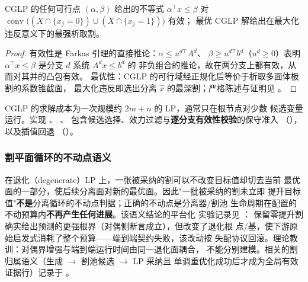 \begin{proposition}
\label{prop:cglp}
CGLP 的任何可行点 $(\alpha, \beta)$ 给出的不等式
$\alpha^\top x \le \beta$ 对
$\operatorname{conv}\big((X\cap\{x_j=0\}) \cup (X\cap\{x_j=1\})\big)$ 有效；
最优 CGLP 解给出在最大化违反意义下的最强析取割。
\end{proposition}
\begin{proof}
有效性是 Farkas 引理的直接推论：$\alpha \le u^{d\top} A^{d}$、
$\beta \ge u^{d\top} b^{d}$（$u^d \ge 0$）表明
$\alpha^\top x \le \beta$ 是分支 $d$ 系统 $A^{d} x \le b^{d}$ 的
非负组合的推论，故在两分支上都有效，从而对其并的凸包有效。
最优性：CGLP 的可行域经正规化后等价于析取多面体极割的系数锥截面，
最大化违反即选出分离 $\hat x$ 的最深割；严格陈述与证明见
\cite{balas1993,cornuejols2008}。
\end{proof}

\begin{remark}
CGLP 的求解成本为一次规模约 $2m + n$ 的 LP，通常只在根节点对少数
候选变量运行。实现
、
、
包含候选选择、效力过滤与\textbf{逐分支有效性校验}的保守准入
（），
以及插值回退
（）。
\end{remark}

\subsubsection{割平面循环的不动点语义}

\begin{remark}[退化 LP 上的割平面不动点]
在退化（degenerate）LP 上，一张被采纳的割可以不改变目标值却切去当前
最优面的一部分，使后续分离面对新的最优面。因此"一批被采纳的割未立即
提升目标值"\textbf{不是}分离循环的不动点判据；正确的不动点是分离器/割池
生命周期在配置的不动预算内\textbf{不再产生任何进展}。该语义结论的平台化
实验记录见
：
保留零提升割确实给出预测的更强根界（对偶侧断言成立），但改变了退化根
点/基，使下游原始启发式消耗了整个预算——端到端契约失败，该改动按
失配协议回滚。理论教训：对偶界增强与端到端运行时间由同一退化面耦合，
不能分别建模。相关的割归属语义（生成 $\to$ 割池候选 $\to$ LP 采纳且
单调重优化成功后才成为全局有效证据行）记录于
。
\end{remark}


